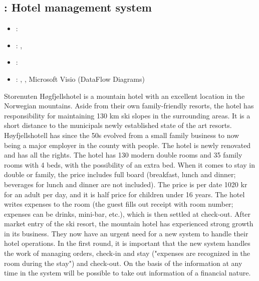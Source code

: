 \subsection[Hotel management system]{: Hotel management system}
\label{sec:inf165_sys_dev}
\begin{itemize} 
	\item {}: 
	\item {}: , 
	\item {}: 
	\item {}: , , Microsoft Visio (DataFlow Diagrams)
\end{itemize} 
Storenuten Høgfjellshotel is a mountain hotel with an excellent location in the Norwegian mountains. 
Aside from their own family-friendly resorts, the hotel has responsibility for maintaining 130 km ski slopes in the surrounding areas.
It is a short distance to the municipals newly established state of the art resorts.
Høyfjellshotell has since the 50s evolved from a small family business to now being a major employer in the county with people. 
The hotel is newly renovated and has all the rights. 
\vspace{0.5em}\newline
The hotel has 130 modern double rooms and 35 family rooms with 4 beds, with the possibility of an extra bed. 
When it comes to stay in double or family, the price includes full board (breakfast, lunch and dinner; beverages for lunch and dinner are not included). 
The price is per date 1020 kr for an adult per day, and it is half price for children under 16 years. 
The hotel writes expenses to the room (the guest fills out receipt with room number; expenses can be drinks, mini-bar, etc.), which is then settled at check-out.
\vspace{0.5em}\newline
After market entry of the ski resort, the mountain hotel has experienced strong growth in its business.
They now have an urgent need for a new system to handle their hotel operations. 
In the first round, it is important that the new system handles the work of managing orders, check-in and stay ("expenses are recognized in the room during the stay") and check-out.
On the basis of the information at any time in the system will be possible to take out information of a financial nature.

